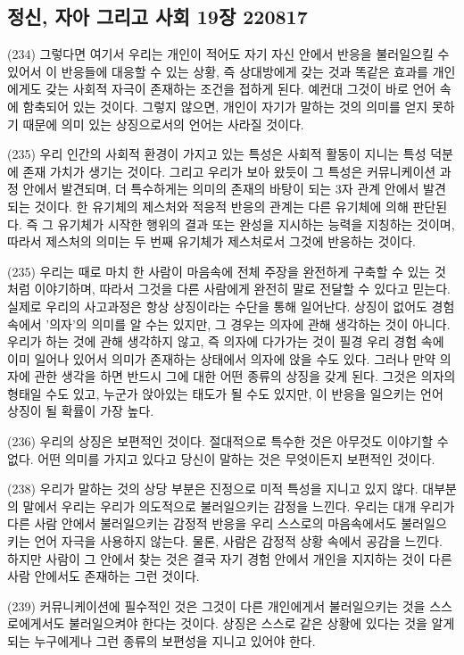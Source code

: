 \documentclass[11pt, a4paper]{article}
\begin{document}
\newpage
\subsection{정신, 자아 그리고 사회 19장 220817}
(234) 그렇다면 여기서 우리는 개인이 적어도 자기 자신 안에서 반응을 불러일으킬 수 있어서 이 반응들에 대응할 수 있는 상황, 즉 상대방에게 갖는 것과 똑같은 효과를 개인에게도 갖는 사회적 자극이 존재하는 조건을 접하게 된다. 예컨대 그것이 바로 언어 속에 함축되어 있는 것이다. 그렇지 않으면, 개인이 자기가 말하는 것의 의미를 얻지 못하기 때문에 의미 있는 상징으로서의 언어는 사라질 것이다.

(235) 우리 인간의 사회적 환경이 가지고 있는 특성은 사회적 활동이 지니는 특성 덕분에 존재 가치가 생기는 것이다. 그리고 우리가 보아 왔듯이 그 특성은 커뮤니케이션 과정 안에서 발견되며, 더 특수하게는 의미의 존재의 바탕이 되는 3자 관계 안에서 발견되는 것이다. 한 유기체의 제스처와 적응적 반응의 관계는 다른 유기체에 의해 판단된다. 즉 그 유기체가 시작한 행위의 결과 또는 완성을 지시하는 능력을 지칭하는 것이며, 따라서 제스처의 의미는 두 번째 유기체가 제스처로서 그것에 반응하는 것이다. 

(235) 우리는 때로 마치 한 사람이 마음속에 전체 주장을 완전하게 구축할 수 있는 것처럼 이야기하며, 따라서 그것을 다른 사람에게 완전히 말로 전달할 수 있다고 믿는다. 실제로 우리의 사고과정은 항상 상징이라는 수단을 통해 일어난다. 상징이 없어도 경험 속에서 '의자'의 의미를 알 수는 있지만, 그 경우는 의자에 관해 생각하는 것이 아니다. 우리가 하는 것에 관해 생각하지 않고, 즉 의자에 다가가는 것이 필경 우리 경험 속에 이미 일어나 있어서 의미가 존재하는 상태에서 의자에 앉을 수도 있다. 그러나 만약 의자에 관한 생각을 하면 반드시 그에 대한 어떤 종류의 상징을 갖게 된다. 그것은 의자의 형태일 수도 있고, 누군가 앉아있는 태도가 될 수도 있지만, 이 반응을 일으키는 언어 상징이 될 확률이 가장 높다.

(236) 우리의 상징은 보편적인 것이다. 절대적으로 특수한 것은 아무것도 이야기할 수 없다. 어떤 의미를 가지고 있다고 당신이 말하는 것은 무엇이든지 보편적인 것이다.

(238) 우리가 말하는 것의 상당 부분은 진정으로 미적 특성을 지니고 있지 않다. 대부분의 말에서 우리는 우리가 의도적으로 불러일으키는 감정을 느낀다. 우리는 대개 우리가 다른 사람 안에서 불러일으키는 감정적 반응을 우리 스스로의 마음속에서도 불러일으키는 언어 자극을 사용하지 않는다. 물론, 사람은 감정적 상황 속에서 공감을 느낀다. 하지만 사람이 그 안에서 찾는 것은 결국 자기 경험 안에서 개인을 지지하는 것이 다른 사람 안에서도 존재하는 그런 것이다. 

(239) 커뮤니케이션에 필수적인 것은 그것이 다른 개인에게서 불러일으키는 것을 스스로에게서도 불러일으켜야 한다는 것이다. 상징은 스스로 같은 상황에 있다는 것을 알게 되는 누구에게나 그런 종류의 보편성을 지니고 있어야 한다. 
\end{document}
